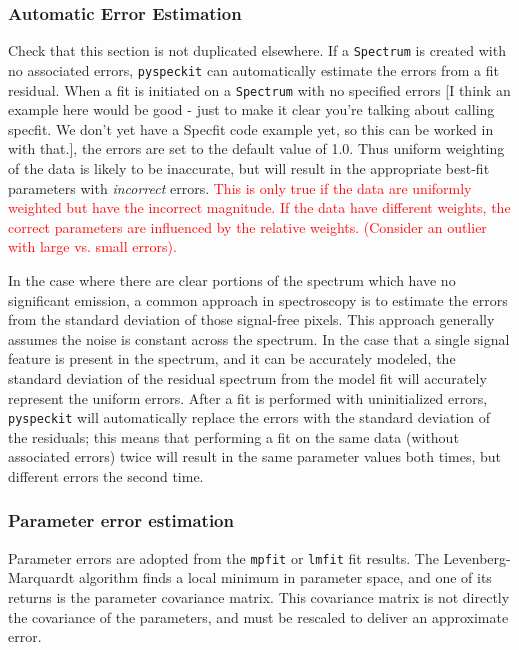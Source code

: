 \documentclass[twocolumn]{aastex62}
\newcommand{\pyspeckit}{\texttt{pyspeckit}\xspace}
\begin{document}
\subsubsection{Automatic Error Estimation}
{\color{red} Check that this section is not duplicated elsewhere.}
If a \texttt{Spectrum} is created with no associated errors, \pyspeckit can
automatically estimate the errors from a fit residual. When a fit is initiated
on a \texttt{Spectrum} with no specified errors [I think an example here would be good - just
to make it clear you're talking about calling specfit. We don't yet have a Specfit code
example yet, so this can be worked in with that.],
the errors are set to the default value of 1.0. Thus uniform weighting of the
data is likely to be inaccurate, but will result in the appropriate best-fit
parameters with \emph{incorrect} errors. \textcolor{red}{This is only true if
the data are uniformly weighted but have the incorrect magnitude.  If the data
have different weights, the correct parameters are influenced by the relative
weights.  (Consider an outlier with large vs. small errors).}

In the case where there are clear portions of the spectrum which have no
significant emission, a common approach in spectroscopy is to estimate the
errors from the standard deviation of those signal-free pixels.  This approach
generally assumes the noise is constant across the spectrum.  In the case that
a single signal feature is present in the spectrum, and it can be accurately
modeled, the standard deviation of the residual spectrum from the model fit
will accurately represent the uniform errors. After a fit is performed with
uninitialized errors,
\pyspeckit will automatically replace the errors with the standard deviation of the
residuals; this means that performing a fit on the same data
(without associated errors) twice will result in the same parameter values both
times, but different errors the second time.


\subsubsection{Parameter error estimation}
\label{sec:parerrest}
Parameter errors are adopted from the \texttt{mpfit} or \texttt{lmfit} fit
results.  The Levenberg-Marquardt algorithm finds a local minimum in parameter
space, and one of its returns is the parameter covariance matrix.  This
covariance matrix is not directly the covariance of the parameters, and must be
rescaled to deliver an approximate error.
\end{document}
